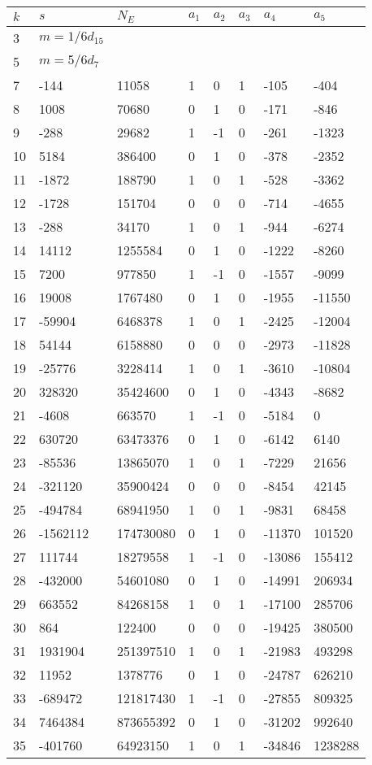 \documentclass{amsart}
\begin{document}
\begin{longtable}{|l|l|l|lllll|}
\hline
$k$ & $s$ & $N_E$ & $a_1$ & $a_2$ & $a_3$ & $a_4$ & $a_5$\\
\hline
3&$m=1/6d_{15}$&&\multicolumn{5}{c|}{}\\
5&$m=5/6d_{7}$&&\multicolumn{5}{c|}{}\\
7&-144&11058&1&0&1&-105&-404\\
8&1008&70680&0&1&0&-171&-846\\
9&-288&29682&1&-1&0&-261&-1323\\
10&5184&386400&0&1&0&-378&-2352\\
11&-1872&188790&1&0&1&-528&-3362\\
12&-1728&151704&0&0&0&-714&-4655\\
13&-288&34170&1&0&1&-944&-6274\\
14&14112&1255584&0&1&0&-1222&-8260\\
15&7200&977850&1&-1&0&-1557&-9099\\
16&19008&1767480&0&1&0&-1955&-11550\\
17&-59904&6468378&1&0&1&-2425&-12004\\
18&54144&6158880&0&0&0&-2973&-11828\\
19&-25776&3228414&1&0&1&-3610&-10804\\
20&328320&35424600&0&1&0&-4343&-8682\\
21&-4608&663570&1&-1&0&-5184&0\\
22&630720&63473376&0&1&0&-6142&6140\\
23&-85536&13865070&1&0&1&-7229&21656\\
24&-321120&35900424&0&0&0&-8454&42145\\
25&-494784&68941950&1&0&1&-9831&68458\\
26&-1562112&174730080&0&1&0&-11370&101520\\
27&111744&18279558&1&-1&0&-13086&155412\\
28&-432000&54601080&0&1&0&-14991&206934\\
29&663552&84268158&1&0&1&-17100&285706\\
30&864&122400&0&0&0&-19425&380500\\
31&1931904&251397510&1&0&1&-21983&493298\\
32&11952&1378776&0&1&0&-24787&626210\\
33&-689472&121817430&1&-1&0&-27855&809325\\
34&7464384&873655392&0&1&0&-31202&992640\\
35&-401760&64923150&1&0&1&-34846&1238288\\

\end{longtable}
\end{document}
